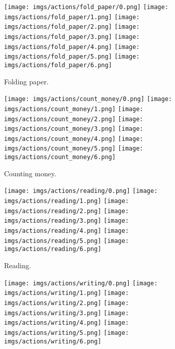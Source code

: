 \documentclass[journal,comsoc]{IEEEtran}
\begin{document}
 \begin{figure*}[t]
\centering
\begin{subfigure}{.99\textwidth}
  \centering
  \texttt{[image: imgs/actions/fold\_paper/0.png]}
  \texttt{[image: imgs/actions/fold\_paper/1.png]}
  \texttt{[image: imgs/actions/fold\_paper/2.png]}
  \texttt{[image: imgs/actions/fold\_paper/3.png]}
  \texttt{[image: imgs/actions/fold\_paper/4.png]}
  \texttt{[image: imgs/actions/fold\_paper/5.png]}
  \texttt{[image: imgs/actions/fold\_paper/6.png]}
  \caption{Folding paper. }
\end{subfigure}
\begin{subfigure}{.99\textwidth}
  \centering
  \texttt{[image: imgs/actions/count\_money/0.png]}
  \texttt{[image: imgs/actions/count\_money/1.png]}
  \texttt{[image: imgs/actions/count\_money/2.png]}
  \texttt{[image: imgs/actions/count\_money/3.png]}
  \texttt{[image: imgs/actions/count\_money/4.png]}
  \texttt{[image: imgs/actions/count\_money/5.png]}
  \texttt{[image: imgs/actions/count\_money/6.png]}
  \caption{Counting money. }
\end{subfigure}
\begin{subfigure}{.99\textwidth}
  \centering
  \texttt{[image: imgs/actions/reading/0.png]}
  \texttt{[image: imgs/actions/reading/1.png]}
  \texttt{[image: imgs/actions/reading/2.png]}
  \texttt{[image: imgs/actions/reading/3.png]}
  \texttt{[image: imgs/actions/reading/4.png]}
  \texttt{[image: imgs/actions/reading/5.png]}
  \texttt{[image: imgs/actions/reading/6.png]}
  \caption{Reading. }
\end{subfigure}
\begin{subfigure}{.99\textwidth}
  \centering
  \texttt{[image: imgs/actions/writing/0.png]}
  \texttt{[image: imgs/actions/writing/1.png]}
  \texttt{[image: imgs/actions/writing/2.png]}
  \texttt{[image: imgs/actions/writing/3.png]}
  \texttt{[image: imgs/actions/writing/4.png]}
  \texttt{[image: imgs/actions/writing/5.png]}
  \texttt{[image: imgs/actions/writing/6.png]}

\end{subfigure}
\end{figure*}
\end{document}
